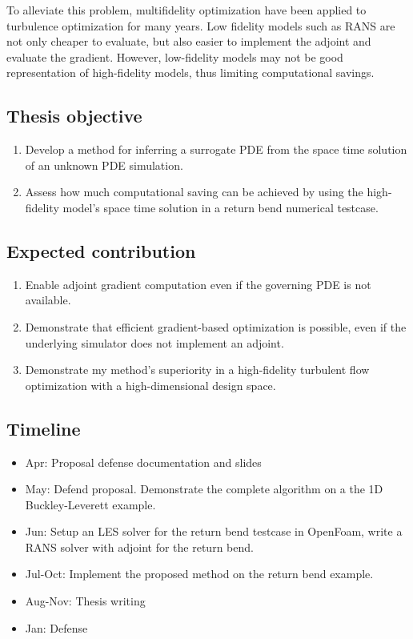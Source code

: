 \documentclass[a4paper,onecolumn]{article}
\theoremstyle{remark}
\begin{document}
\noindent To alleviate this problem, multifidelity optimization have been applied to turbulence optimization for many years. Low fidelity models such as RANS are not only cheaper to evaluate, but also easier to implement the adjoint and evaluate the gradient. However, low-fidelity models may not be good representation of high-fidelity models, thus limiting computational savings.\\

\subsection{Thesis objective}
\begin{enumerate}
    \item Develop a method for inferring a surrogate PDE from the space time solution of an unknown PDE simulation.
    \item Assess how much computational saving can be achieved by using the high-fidelity model's space time solution in  a return bend numerical testcase.
\end{enumerate}

\subsection{Expected contribution}
\begin{enumerate}
    \item Enable adjoint gradient computation even if the governing PDE is not available.
    \item Demonstrate that efficient gradient-based optimization is possible, even if the underlying simulator does not implement
          an adjoint.
    \item Demonstrate my method's superiority in a high-fidelity turbulent flow optimization with a
    high-dimensional design space.
\end{enumerate}


\subsection{Timeline}
\begin{itemize}
    \item Apr: Proposal defense documentation and slides
    \item May: Defend proposal. Demonstrate the complete algorithm on a the 1D Buckley-Leverett example.
    \item Jun: Setup an LES solver for the return bend testcase in OpenFoam, write a RANS solver with adjoint for the return bend.
    \item Jul-Oct: Implement the proposed method on the return bend example.
    \item Aug-Nov: Thesis writing
    \item Jan: Defense
\end{itemize}
\end{document}
